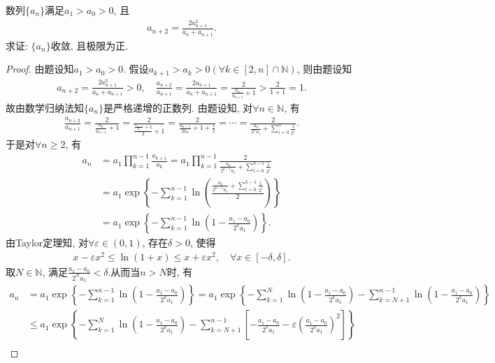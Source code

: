 \documentclass[../../main.tex]{subfiles}%
\begin{document}
\begin{example}
数列$\{a_n\}$满足$a_1 > a_0 > 0$, 且
\begin{align*}
a_{n+2} = \frac{2a_{n+1}^2}{a_n + a_{n+1}}.
\end{align*}
求证: $\{a_n\}$收敛, 且极限为正.
\end{example}
\begin{proof}
由题设知$a_1>a_0>0$. 假设$a_{k+1}>a_k>0\left( \forall k\in \left[ 2,n \right] \cap \mathbb{N} \right)$, 则由题设知
\begin{align*}
a_{n+2}=\frac{2a_{n+1}^{2}}{a_n+a_{n+1}}>0, \quad \frac{a_{n+2}}{a_{n+1}}=\frac{2a_{n+1}}{a_n+a_{n+1}}=\frac{2}{\frac{a_n}{a_{n+1}}+1}>\frac{2}{1+1}=1.
\end{align*}
故由数学归纳法知$\{a_n\}$是严格递增的正数列. 由题设知, 对$\forall n\in \mathbb{N}$, 有
\begin{align*}
\frac{a_{n+2}}{a_{n+1}}=\frac{2}{\frac{a_n}{a_{n+1}}+1}=\frac{2}{\frac{\frac{a_{n-1}}{a_n}+1}{2}+1}=\frac{2}{\frac{a_{n-1}}{2a_n}+1+\frac{1}{2}}=\cdots =\frac{2}{\frac{a_0}{2^n a_1}+\sum\limits_{i=0}^n \frac{1}{2^i}}.
\end{align*}
于是对$\forall n\geqslant 2$, 有
\begin{align*}
a_n &= a_1\prod\limits_{k=1}^{n-1} \frac{a_{k+1}}{a_k} = a_1\prod\limits_{k=1}^{n-1} \frac{2}{\frac{a_0}{2^{k-1}a_1}+\sum\limits_{i=0}^{k-1} \frac{1}{2^i}} \\
&= a_1\exp\left\{ -\sum\limits_{k=1}^{n-1} \ln\left( \frac{\frac{a_0}{2^{k-1}a_1}+\sum\limits_{i=0}^{k-1} \frac{1}{2^i}}{2} \right) \right\} \\
&= a_1\exp\left\{ -\sum\limits_{k=1}^{n-1} \ln\left( 1-\frac{a_1-a_0}{2^k a_1} \right) \right\}.
\end{align*}
由Taylor定理知, 对$\forall \varepsilon \in \left( 0,1 \right)$, 存在$\delta >0$, 使得
\begin{align*}
x-\varepsilon x^2\leqslant \ln\left( 1+x \right) \leqslant x+\varepsilon x^2, \quad \forall x\in \left[ -\delta ,\delta \right].
\end{align*}
取$N\in \mathbb{N}$, 满足$\frac{a_1-a_0}{2^N a_1}<\delta$.从而当$n>N$时, 有
\begin{align*}
a_n &= a_1\exp\left\{ -\sum\limits_{k=1}^{n-1} \ln\left( 1-\frac{a_1-a_0}{2^k a_1} \right) \right\} 
= a_1\exp\left\{ -\sum\limits_{k=1}^N \ln\left( 1-\frac{a_1-a_0}{2^k a_1} \right) -\sum\limits_{k=N+1}^{n-1} \ln\left( 1-\frac{a_1-a_0}{2^k a_1} \right) \right\} \\
&\leqslant a_1\exp\left\{ -\sum\limits_{k=1}^N \ln\left( 1-\frac{a_1-a_0}{2^k a_1} \right) -\sum\limits_{k=N+1}^{n-1} \left[ -\frac{a_1-a_0}{2^k a_1}-\varepsilon \left( \frac{a_1-a_0}{2^k a_1} \right)^2 \right] \right\} \\

\end{align*}
\end{proof}
\end{document}
